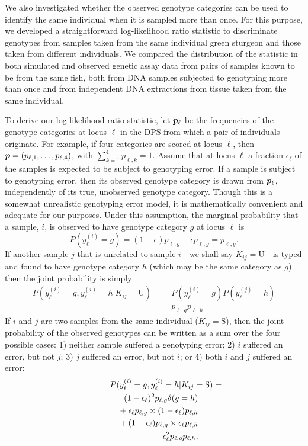 We also 
investigated whether the observed genotype
categories can be used to identify the same individual when it is sampled more than once.
For this purpose, we developed a straightforward log-likelihood ratio statistic
to discriminate genotypes from samples taken from the same individual
green sturgeon and those taken from different individuals. We compared the
distribution of the statistic in both simulated and observed genetic
assay data from pairs of samples known to be from the same fish, 
both from DNA samples subjected to genotyping more than once and from
independent DNA extractions from tissue taken from the same individual.

To derive our log-likelihood ratio statistic, let $\bp_\ell$ 
be the frequencies of the genotype categories at locus $\ell$ in the DPS from which a pair of individuals
originate.  For example, if four categories are 
scored at locus $\ell$, then $\bp = (p_{\ell,1}, \ldots, p_{\ell,4})$, with $\sum_{k=1}^4 p_{\ell,k} = 1$.
Assume that at locus $\ell$ a fraction $\epsilon_\ell$ of the samples is expected to be subject to 
genotyping error.  If a sample is subject to genotyping error, then its observed genotype category
is drawn from $\bp_\ell$, independently of its true, unobserved genotype category. Though this is
a somewhat unrealistic genotyping error model, it is mathematically convenient and adequate for
our purposes.  Under this assumption,
the marginal probability that a sample, $i$, is observed to have genotype category $g$ at locus $\ell$ is
\[
P(y^{(i)}_\ell = g) = (1-\epsilon)p_{\ell,g} + \epsilon p_{\ell,g} = p_{\ell,g}.
\]
If another sample $j$ that is unrelated to sample $i$---we shall say $K_{ij} = \mathrm{U}$---is typed
and found to have genotype category $h$ (which may be the same category as $g$) then the joint probability is simply
\begin{eqnarray}
P(y^{(i)}_\ell = g, y^{(i)}_\ell = h | K_{ij} = \mathrm{U}) &=& P(y^{(i)}_\ell = g)P(y^{(j)}_\ell = h)  \nonumber \\
& = & p_{\ell,g} p_{\ell,h}  \label{eq:pairU}
\end{eqnarray}
If $i$ and $j$ are two samples from the same individual ($K_{ij} = \mathrm{S}$), then the joint probability of the observed genotypes
can be written as a sum over the four possible cases: 1) neither sample suffered a genotyping error; 2) $i$ suffered
an error, but not $j$; 3) $j$ suffered an error, but not $i$; or 4) both $i$ and $j$ suffered an error:
\begin{eqnarray*}
\lefteqn{P(y^{(i)}_\ell = g, y^{(i)}_\ell = h | K_{ij} = \mathrm{S})  =} \\
& & (1-\epsilon_\ell)^2  p_{\ell,g}  \delta(g = h)  \\
& & \mbox{} + \epsilon_\ell p_{\ell,g} \times (1-\epsilon_\ell) p_{\ell,h}  \\
& & \mbox{} + (1-\epsilon_\ell)p_{\ell,g} \times \epsilon_\ell p_{\ell,h} \\
& & \mbox{} + \epsilon_\ell^2 p_{\ell,g} p_{\ell,h},
\end{eqnarray*}
